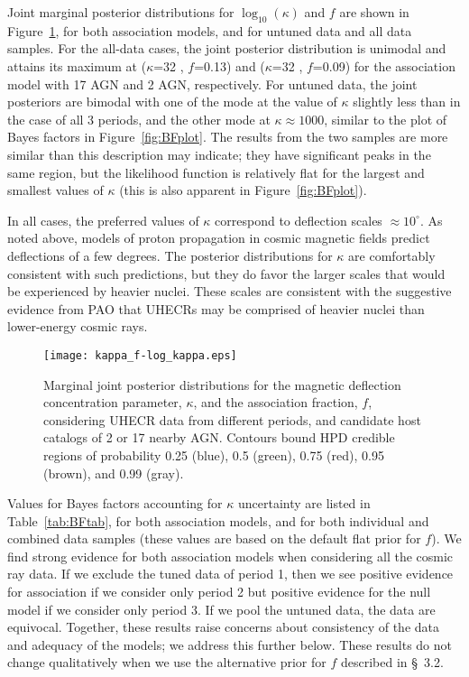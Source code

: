 Joint marginal posterior distributions for $\log_{10}(\kappa)$ and $f$ are
shown in Figure~\ref{fig:jointkappaf}, for both association models, and for
untuned data and all data samples.  For the all-data cases, the joint
posterior distribution is unimodal and attains its maximum at ($\kappa$=32 ,
$f$=0.13) and ($\kappa$=32 , $f$=0.09) for the association model with 17
AGN and 2 AGN, respectively.  For untuned data, the joint posteriors are
bimodal with one of the mode at the value of $\kappa$ slightly less than in
the case of all 3 periods, and the other mode at $\kappa\approx 1000$,
similar to the plot of Bayes factors in Figure~\ref{fig:BFplot}.  The
results from the two samples are more similar than this description may
indicate; they have significant peaks in the same region, but the likelihood
function is relatively flat for the largest and smallest values of $\kappa$
(this is also apparent in Figure~\ref{fig:BFplot}).

In all cases, the preferred values of $\kappa$ correspond to deflection
scales $\approx 10^\circ$.  As noted above, models of proton propagation in
cosmic magnetic fields predict deflections of a few degrees.
The posterior distributions for $\kappa$ are comfortably consistent with
such predictions, but they do favor the larger scales that would be
experienced by heavier nuclei.  These scales are consistent with the
suggestive evidence from PAO that UHECRs may be comprised of heavier nuclei
than lower-energy cosmic rays.

\begin{figure}
\centerline{\texttt{[image: kappa\_f-log\_kappa.eps]}}
\caption{Marginal joint posterior distributions for the magnetic deflection
concentration parameter, $\kappa$, and the association fraction, $f$,
considering UHECR data from different periods, and candidate host catalogs of 2
or 17 nearby AGN.  Contours bound HPD credible regions of probability
0.25 (blue), 0.5 (green), 0.75 (red), 0.95 (brown), and 0.99 (gray).}
\label{fig:jointkappaf}
\end{figure}

Values for Bayes factors accounting for $\kappa$ uncertainty are listed in
Table~\ref{tab:BFtab}, for both association models, and for both individual
and combined data samples (these values are based on the default flat
prior for $f$).  We find strong evidence for both association models when
considering all the cosmic ray data.  If we exclude the tuned data of period
1, then we see positive evidence for association if we consider only period
2 but positive evidence for the null model if we consider only period 3.  If
we pool the untuned data, the data are equivocal.  Together, these results
raise concerns about consistency of the data and adequacy of the models; we
address this further below.  These results do not change qualitatively when
we use the alternative prior for $f$ described in \S~3.2.

